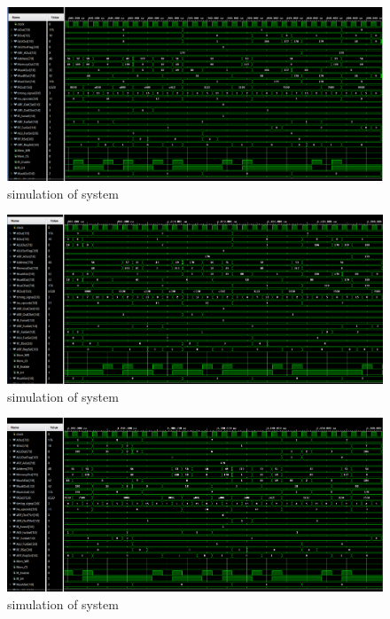 \documentclass[pdftex,12pt,a4paper]{article}
\begin{document}
\begin{figure}[H]
    \centering
    \includegraphics[width=1\textwidth]{photos/system_result_3.png}	
    \caption{simulation of system}
    \label{implementation}
\end{figure}



\begin{figure}[H]
    \centering
    \includegraphics[width=1\textwidth]{photos/system_result_4.png}	
    \caption{simulation of system}
    \label{implementation}
\end{figure}

\begin{figure}[H]
    \centering
    \includegraphics[width=1\textwidth]{photos/system_result_5.png}	
    \caption{simulation of system}
    \label{implementation}
\end{figure}
\end{document}
